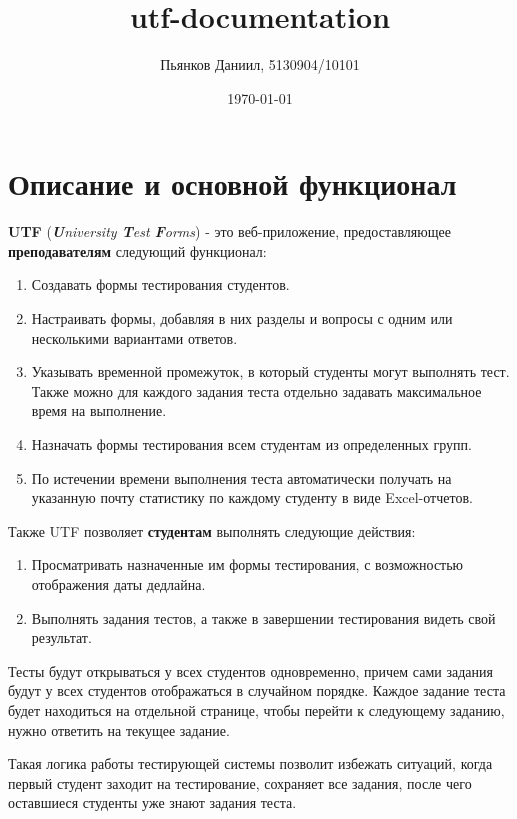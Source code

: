 \documentclass[4paper,12pt]{article}
\author{Пьянков Даниил, 5130904/10101}
\title{utf-documentation}
\date{\today}
\begin{document}
	\maketitle
	\tableofcontents
	
	\section{Описание и основной функционал}
	\textbf{UTF} (\textit{\textbf{U}niversity \textbf{T}est \textbf{F}orms}) - это веб-приложение, предоставляющее \textbf{преподавателям} следующий функционал:
	
	\begin{enumerate}
		\item Создавать формы тестирования студентов.
		\item Настраивать формы, добавляя в них разделы и вопросы с одним или несколькими вариантами ответов.
		\item Указывать временной промежуток, в который студенты могут выполнять тест. Также можно для каждого задания теста отдельно задавать максимальное время на выполнение.
		\item Назначать формы тестирования всем студентам из определенных групп.
		\item По истечении времени выполнения теста автоматически получать на указанную почту статистику по каждому студенту в виде Excel-отчетов.
	\end{enumerate}
	
	Также UTF позволяет \textbf{студентам} выполнять следующие действия:
	\begin{enumerate}
		\item Просматривать назначенные им формы тестирования, с возможностью отображения даты дедлайна.
		
		\item Выполнять задания тестов, а также в завершении тестирования видеть свой результат.
	\end{enumerate}
	
	Тесты будут открываться у всех студентов одновременно, причем сами задания будут у всех студентов отображаться в случайном порядке. Каждое задание теста будет находиться на отдельной странице, чтобы перейти к следующему заданию, нужно ответить на текущее задание.
	
	Такая логика работы тестирующей системы позволит избежать ситуаций, когда первый студент заходит на тестирование, сохраняет все задания, после чего оставшиеся студенты уже знают задания теста.
	
\end{document}
